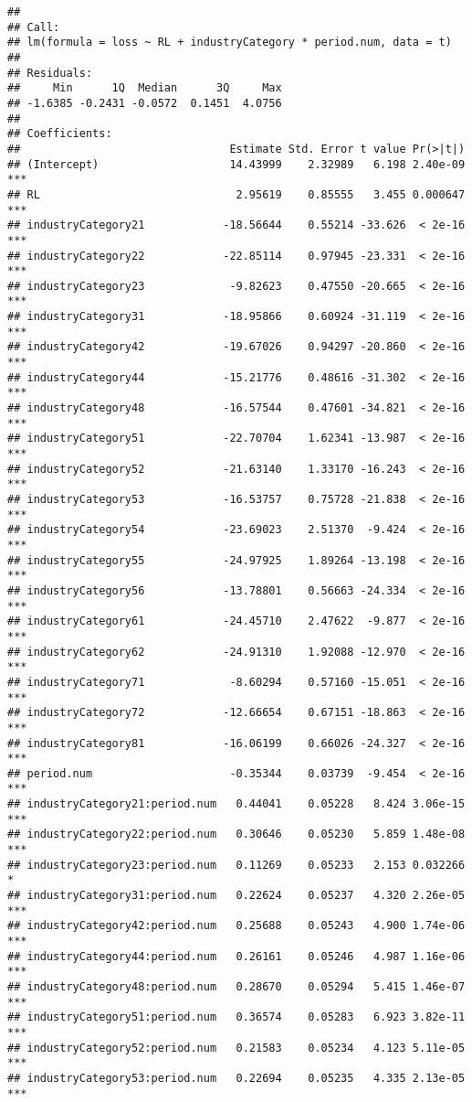 \documentclass[
]{article}
\begin{document}
\begin{verbatim}
## 
## Call:
## lm(formula = loss ~ RL + industryCategory * period.num, data = t)
## 
## Residuals:
##     Min      1Q  Median      3Q     Max 
## -1.6385 -0.2431 -0.0572  0.1451  4.0756 
## 
## Coefficients:
##                                Estimate Std. Error t value Pr(>|t|)    
## (Intercept)                    14.43999    2.32989   6.198 2.40e-09 ***
## RL                              2.95619    0.85555   3.455 0.000647 ***
## industryCategory21            -18.56644    0.55214 -33.626  < 2e-16 ***
## industryCategory22            -22.85114    0.97945 -23.331  < 2e-16 ***
## industryCategory23             -9.82623    0.47550 -20.665  < 2e-16 ***
## industryCategory31            -18.95866    0.60924 -31.119  < 2e-16 ***
## industryCategory42            -19.67026    0.94297 -20.860  < 2e-16 ***
## industryCategory44            -15.21776    0.48616 -31.302  < 2e-16 ***
## industryCategory48            -16.57544    0.47601 -34.821  < 2e-16 ***
## industryCategory51            -22.70704    1.62341 -13.987  < 2e-16 ***
## industryCategory52            -21.63140    1.33170 -16.243  < 2e-16 ***
## industryCategory53            -16.53757    0.75728 -21.838  < 2e-16 ***
## industryCategory54            -23.69023    2.51370  -9.424  < 2e-16 ***
## industryCategory55            -24.97925    1.89264 -13.198  < 2e-16 ***
## industryCategory56            -13.78801    0.56663 -24.334  < 2e-16 ***
## industryCategory61            -24.45710    2.47622  -9.877  < 2e-16 ***
## industryCategory62            -24.91310    1.92088 -12.970  < 2e-16 ***
## industryCategory71             -8.60294    0.57160 -15.051  < 2e-16 ***
## industryCategory72            -12.66654    0.67151 -18.863  < 2e-16 ***
## industryCategory81            -16.06199    0.66026 -24.327  < 2e-16 ***
## period.num                     -0.35344    0.03739  -9.454  < 2e-16 ***
## industryCategory21:period.num   0.44041    0.05228   8.424 3.06e-15 ***
## industryCategory22:period.num   0.30646    0.05230   5.859 1.48e-08 ***
## industryCategory23:period.num   0.11269    0.05233   2.153 0.032266 *  
## industryCategory31:period.num   0.22624    0.05237   4.320 2.26e-05 ***
## industryCategory42:period.num   0.25688    0.05243   4.900 1.74e-06 ***
## industryCategory44:period.num   0.26161    0.05246   4.987 1.16e-06 ***
## industryCategory48:period.num   0.28670    0.05294   5.415 1.46e-07 ***
## industryCategory51:period.num   0.36574    0.05283   6.923 3.82e-11 ***
## industryCategory52:period.num   0.21583    0.05234   4.123 5.11e-05 ***
## industryCategory53:period.num   0.22694    0.05235   4.335 2.13e-05 ***

\end{verbatim}
\end{document}
